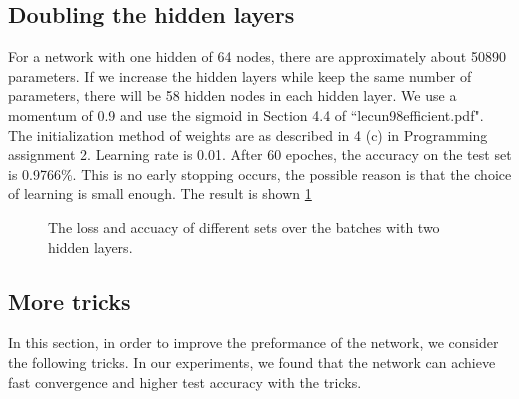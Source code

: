 \documentclass{article} %
\begin{document}
\subsection{Doubling the hidden layers}
For a network with one hidden of 64 nodes, there are approximately about 50890 parameters. If we increase the hidden layers while keep the same number of parameters, there will be 58 hidden nodes in each hidden layer. We use a momentum of 0.9 and use the sigmoid in Section 4.4 of ``lecun98efficient.pdf". The initialization method of weights are as described in 4 (c) in Programming assignment 2. Learning rate is 0.01. After 60 epoches, the accuracy on the test set is 0.9766\%. This is no early stopping occurs, the possible reason is that the choice of learning is small enough.
The result is shown \ref{Figure: double}
\begin{figure} [!htbp]
	
	\caption{The loss and accuacy of different sets over the batches with two hidden layers. }  
	\label{Figure: double}
\end{figure}


\subsection{More tricks}
In this section, in order to improve the preformance of the network, we consider the following tricks. In our experiments, we found that the network can achieve fast convergence and higher test accuracy with the tricks.
\end{document}
